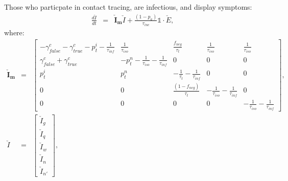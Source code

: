 \documentclass[notitlepage, superscriptaddress]{revtex4-2}
\begin{document}
Those who particpate in contact tracing, are infectious, and display symptoms:
\begin{eqnarray}
\frac{d\check{I}}{dt} &=& \boldsymbol{\check{I}_{m}}  \check{I} + \frac{(1-p_{a})}{\tau_{inc}} \mathbb{1} \cdot  \check{E}, 
\end{eqnarray}
where:
%
\begin{eqnarray}
\boldsymbol{\check{I}_{m}} &=&
\begin{bmatrix}
 -\gamma^{c}_{false} -\gamma^{c}_{true} - p^{i}_{t} -\frac{1}{\tau_{inf}} & \frac{1}{\tau_{iso}}  & \frac{f_{neg}}{\tau_{t}} & \frac{1}{\tau_{iso}} & \frac{1}{\tau_{iso}} \\
\gamma^{c}_{false} + \gamma^{c}_{true}    &  -p^{n}_{t}  - \frac{1}{\tau_{iso}} - \frac{1}{\tau_{inf}}      &  0    & 0  & 0\\
p^{i}_{t}     &  p^{n}_{t}                  &  -\frac{1}{\tau_{t}}  - \frac{1}{\tau_{inf}}  & 0 & 0\\
0 & 0 & \frac{(1-f_{neg})}{\tau_{t}}  & -\frac{1}{\tau_{iso}}  -  \frac{1}{\tau_{inf}} & 0 \\ 
0 & 0 & 0 & 0 & -\frac{1}{\tau_{iso}}  -  \frac{1}{\tau_{inf}}
\end{bmatrix}, \\ 
%
\check{I} &=& 
\begin{bmatrix}
\check{I}_{g} \\ \check{I}_{q} \\ \check{I}_{w}\\ \check{I}_{n} \\ \check{I}_{n'}
\end{bmatrix}, 
%
\end{eqnarray}

\end{document}
